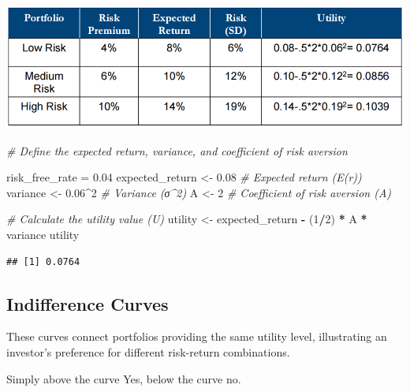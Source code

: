 \documentclass[
]{book}
\newenvironment{Shaded}{\begin{snugshade}}{\end{snugshade}}
\newcommand{\CommentTok}[1]{\textcolor[rgb]{0.56,0.35,0.01}{\textit{#1}}}
\newcommand{\DecValTok}[1]{\textcolor[rgb]{0.00,0.00,0.81}{#1}}
\newcommand{\FloatTok}[1]{\textcolor[rgb]{0.00,0.00,0.81}{#1}}
\newcommand{\NormalTok}[1]{#1}
\newcommand{\OtherTok}[1]{\textcolor[rgb]{0.56,0.35,0.01}{#1}}
\newcommand{\SpecialCharTok}[1]{\textcolor[rgb]{0.81,0.36,0.00}{\textbf{#1}}}
\begin{document}
\includegraphics{Resources/utilisation.png}

\begin{Shaded}
\begin{Highlighting}[]
\CommentTok{\# Define the expected return, variance, and coefficient of risk aversion}

\NormalTok{risk\_free\_rate }\OtherTok{=} \FloatTok{0.04}
\NormalTok{expected\_return }\OtherTok{\textless{}{-}} \FloatTok{0.08}  \CommentTok{\# Expected return (E(r))}
\NormalTok{variance }\OtherTok{\textless{}{-}} \FloatTok{0.06}\SpecialCharTok{\^{}}\DecValTok{2}         \CommentTok{\# Variance (σ\^{}2)}
\NormalTok{A }\OtherTok{\textless{}{-}} \DecValTok{2}                   \CommentTok{\# Coefficient of risk aversion (A)}

\CommentTok{\# Calculate the utility value (U)}
\NormalTok{utility }\OtherTok{\textless{}{-}}\NormalTok{ expected\_return }\SpecialCharTok{{-}}\NormalTok{ (}\DecValTok{1}\SpecialCharTok{/}\DecValTok{2}\NormalTok{) }\SpecialCharTok{*}\NormalTok{ A }\SpecialCharTok{*}\NormalTok{ variance}
\NormalTok{utility}
\end{Highlighting}
\end{Shaded}

\begin{verbatim}
## [1] 0.0764
\end{verbatim}

\hypertarget{indifference-curves}{%
\subsection{Indifference Curves}\label{indifference-curves}}

These curves connect portfolios providing the same utility level,
illustrating an investor's preference for different risk-return
combinations.

Simply above the curve Yes, below the curve no.
\end{document}
